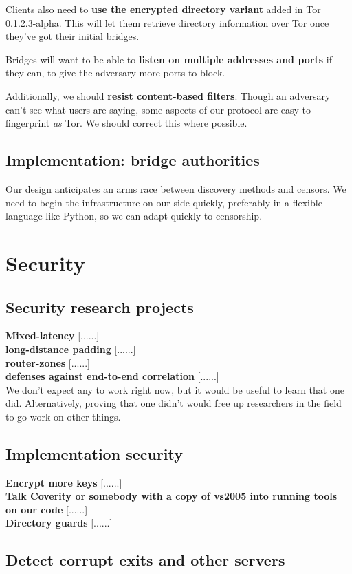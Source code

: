 \documentclass{article}
\newcommand{\tmp}[1]{{\bf #1} [......] \\}
\begin{document}
Clients also need to {\bf use the encrypted directory variant} added in Tor
0.1.2.3-alpha.  This will let them retrieve directory information over Tor
once they've got their initial bridges.

Bridges will want to be able to {\bf listen on multiple addresses and ports}
if they can, to give the adversary more ports to block.

Additionally, we should {\bf resist content-based filters}.  Though an
adversary can't see what users are saying, some aspects of our protocol are
easy to fingerprint {\em as} Tor.  We should correct this where possible.

\subsection{Implementation: bridge authorities}
Our design anticipates an arms race between discovery methods and censors.
We need to begin the infrastructure on our side quickly, preferably in a
flexible language like Python, so we can adapt quickly to censorship.

\section{Security}

\subsection{Security research projects}

\tmp{Mixed-latency}

\tmp{long-distance padding}

\tmp{router-zones}

\tmp{defenses against end-to-end correlation}  We don't expect any to work
right now, but it would be useful to learn that one did.  Alternatively,
proving that one didn't would free up researchers in the field to go work on
other things.

\subsection{Implementation security}

\tmp{Encrypt more keys}

\tmp{Talk Coverity or somebody with a copy of vs2005 into running tools on
  our code}

\tmp{Directory guards}

\subsection{Detect corrupt exits and other servers}
\end{document}

